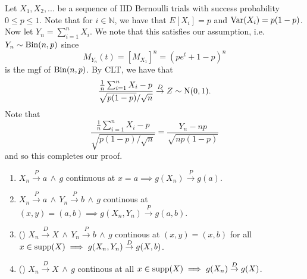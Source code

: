 \documentclass[notoc,notitlepage]{tufte-book}
\newcommand{\convd}{\overset{D}{\to}}
\newcommand{\convp}{\overset{P}{\to}}
\begin{document}
\begin{solution}
  Let $X_1, X_2, ...$ be a sequence of IID Bernoulli trials with success probability $0 \leq p \leq 1$. Note that for $i \in \mathbb{N}$, we have that $E[X_i] = p$ and $\operatorname{Var}(X_i) = p(1 - p)$. Now let $Y_n = \sum_{i=1}^{n} X_i$. We note that this satisfies our assumption, i.e. $Y_n \sim \operatorname{Bin}(n, p)$ since
  \begin{equation*}
    M_{Y_n}(t) = [ M_{X_1} ]^n = (pe^t + 1 - p)^n
  \end{equation*}
  is the mgf of $\operatorname{Bin}(n, p)$. By CLT, we have that
  \begin{equation*}
    \frac{\frac{1}{n} \sum_{i=1}^{n} X_i - p}{\sqrt{ p(1 - p) } / \sqrt{n}} \convd Z \sim \Nor(0, 1).
  \end{equation*}
  Note that
  \begin{equation*}
    \frac{\frac{1}{n} \sum_{i=1}^{n} X_i - p}{\sqrt{p (1 - p) / \sqrt{n}}} = \frac{Y_n - np}{\sqrt{np(1 - p)}}
  \end{equation*}
  and so this completes our proof.
\end{solution}

\begin{propo}
\label{propo:other_limit_theorems}
  \begin{enumerate}
    \item $X_n \convp a \, \land \, g$ continuous at $x = a \implies g(X_n) \convp g(a)$.
    \item $X_n \convp a \, \land \, Y_n \convp b \, \land \, g$ continous at $(x, y) = (a, b) \implies g(X_n, Y_n) \convp g(a, b)$.
    \item () $X_n \convd X \, \land \, Y_n \convp b \, \land \, g$ continous at $(x, y) = (x, b)$ for all $x \in \supp( X ) \implies g(X_n, Y_n) \convd g(X, b)$.
    \item () $X_n \convd X \, \land \, g$ continous at all $x \in \supp(X) \implies g(X_n) \convd g(X)$.
  \end{enumerate}
\end{propo}
\end{document}
